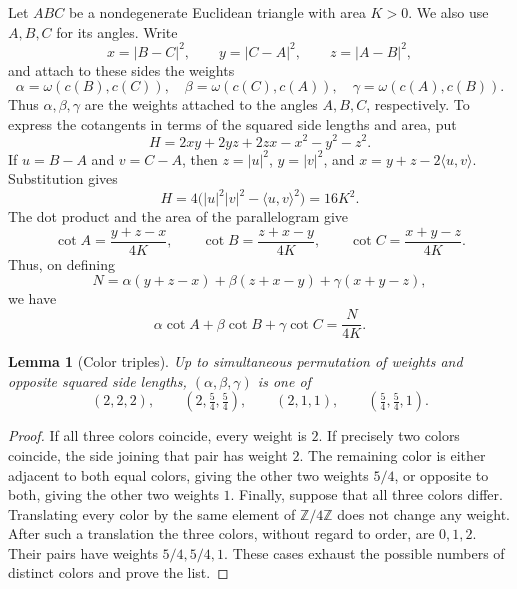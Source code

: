 \documentclass[11pt,a4paper]{article}
\newtheorem{lemma}[theorem]{Lemma}
\theoremstyle{definition}
\theoremstyle{remark}
\newcommand{\Z}{\mathbb{Z}}
\begin{document}
Let $ABC$ be a nondegenerate Euclidean triangle with area $K>0$. We also
use $A,B,C$ for its angles. Write
\begin{equation}
\label{eq:squared-sides}
x=|B-C|^2,\qquad y=|C-A|^2,\qquad z=|A-B|^2,
\end{equation}
and attach to these sides the weights
\[
\alpha=\omega(c(B),c(C)),\quad
\beta=\omega(c(C),c(A)),\quad
\gamma=\omega(c(A),c(B)).
\]
Thus $\alpha,\beta,\gamma$ are the weights attached to the angles
$A,B,C$, respectively. To express the cotangents in terms of the squared
side lengths and area, put
\begin{equation}
\label{eq:heron}
H=2xy+2yz+2zx-x^2-y^2-z^2.
\end{equation}
If $u=B-A$ and $v=C-A$, then $z=|u|^2$, $y=|v|^2$, and
$x=y+z-2\langle u,v\rangle$. Substitution gives
\begin{equation}
\label{eq:heron-area}
H=4\bigl(|u|^2|v|^2-\langle u,v\rangle^2\bigr)=16K^2.
\end{equation}
The dot product and the area of the parallelogram give
\begin{equation}
\label{eq:cot-formulas}
\cot A=\frac{y+z-x}{4K},\qquad
\cot B=\frac{z+x-y}{4K},\qquad
\cot C=\frac{x+y-z}{4K}.
\end{equation}
Thus, on defining
\begin{equation}
\label{eq:marked-numerator}
N=\alpha(y+z-x)+\beta(z+x-y)+\gamma(x+y-z),
\end{equation}
we have
\begin{equation}
\label{eq:marked-quotient}
\alpha\cot A+\beta\cot B+\gamma\cot C=\frac{N}{4K}.
\end{equation}

\begin{lemma}[Color triples]
\label{lem:color-triples}
Up to simultaneous permutation of weights and opposite squared side
lengths, $(\alpha,\beta,\gamma)$ is one of
\begin{equation}
\label{eq:color-triples}
(2,2,2),\qquad(2,\tfrac54,\tfrac54),\qquad
(2,1,1),\qquad(\tfrac54,\tfrac54,1).
\end{equation}
\end{lemma}

\begin{proof}
If all three colors coincide, every weight is $2$. If precisely two
colors coincide, the side joining that pair has weight $2$. The remaining
color is either adjacent to both equal colors, giving the other two
weights $5/4$, or opposite to both, giving the other two weights $1$.
Finally, suppose that all three colors differ. Translating every color
by the same element of $\Z/4\Z$ does not change any weight. After such a
translation the three colors, without regard to order, are $0,1,2$.
Their pairs have weights $5/4,5/4,1$. These cases exhaust the possible
numbers of distinct colors and prove the list.
\end{proof}
\end{document}
